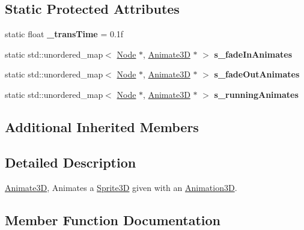 \subsection*{Static Protected Attributes}
\begin{DoxyCompactItemize}
\item 
\mbox{\label{classAnimate3D_a18d2e9a7cb3b503fc384d6da2fec212e}} 
static float {\bfseries \+\_\+trans\+Time} = 0.\+1f
\item 
\mbox{\label{classAnimate3D_aae8036cd8c984cea8203c20fd002d51f}} 
static std\+::unordered\+\_\+map$<$ \hyperlink{classNode}{Node} $\ast$, \hyperlink{classAnimate3D}{Animate3D} $\ast$ $>$ {\bfseries s\+\_\+fade\+In\+Animates}
\item 
\mbox{\label{classAnimate3D_a7d908465df233018b8809934919753a8}} 
static std\+::unordered\+\_\+map$<$ \hyperlink{classNode}{Node} $\ast$, \hyperlink{classAnimate3D}{Animate3D} $\ast$ $>$ {\bfseries s\+\_\+fade\+Out\+Animates}
\item 
\mbox{\label{classAnimate3D_af32e9dc2f42ec958db9f4c6ccb190efc}} 
static std\+::unordered\+\_\+map$<$ \hyperlink{classNode}{Node} $\ast$, \hyperlink{classAnimate3D}{Animate3D} $\ast$ $>$ {\bfseries s\+\_\+running\+Animates}
\end{DoxyCompactItemize}
\subsection*{Additional Inherited Members}


\subsection{Detailed Description}
\hyperlink{classAnimate3D}{Animate3D}, Animates a \hyperlink{classSprite3D}{Sprite3D} given with an \hyperlink{classAnimation3D}{Animation3D}. 

\subsection{Member Function Documentation}
\mbox{\label{classAnimate3D_a13868382e90e2760717cf8f91f697bc0}} 
